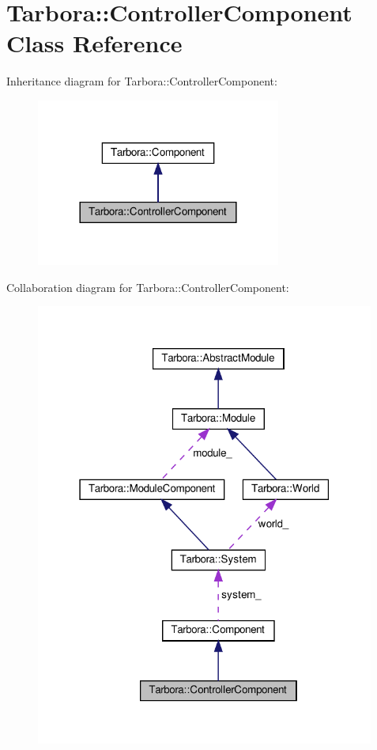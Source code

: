 \hypertarget{classTarbora_1_1ControllerComponent}{}\section{Tarbora\+:\+:Controller\+Component Class Reference}
\label{classTarbora_1_1ControllerComponent}


Inheritance diagram for Tarbora\+:\+:Controller\+Component\+:
\nopagebreak
\begin{figure}[H]
\begin{center}
\leavevmode
\includegraphics[width=228pt]{classTarbora_1_1ControllerComponent__inherit__graph}
\end{center}
\end{figure}


Collaboration diagram for Tarbora\+:\+:Controller\+Component\+:
\nopagebreak
\begin{figure}[H]
\begin{center}
\leavevmode
\includegraphics[width=316pt]{classTarbora_1_1ControllerComponent__coll__graph}
\end{center}
\end{figure}
